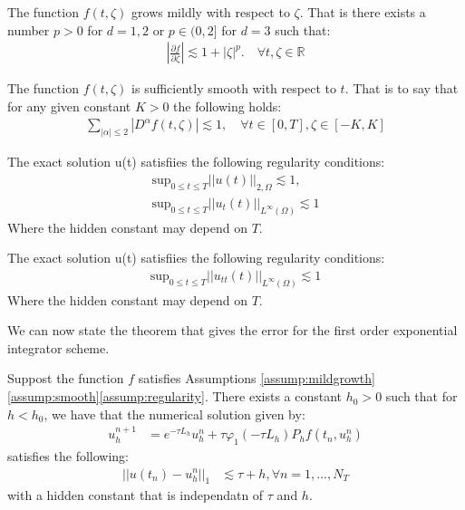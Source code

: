 \begin{assumption}\label{assump:mildgrowth}
    The function $f(t,\zeta)$ grows mildly with respect to $\zeta$.
    That is there exists a number $p>0$ for $d=1,2$ or $p\in(0,2]$ for $d=3$ such that:
    \begin{align*}
        |\frac{\partial f}{\partial \zeta}| \lesssim 1 + |\zeta|^p. \quad \forall t,\zeta \in \mathbb{R}
    \end{align*}
\end{assumption}
\begin{assumption}\label{assump:smooth}
    The function $f(t, \zeta)$ is sufficiently smooth with respect to $t$.
    That is to say that for any given constant $K>0$ the following holds:
    \begin{align*}
        \sum_{|\alpha|\leq2}|D^{\alpha}f(t,\zeta)|\lesssim 1, \quad \forall t\in [0,T], \zeta \in[-K,K]
    \end{align*}
\end{assumption}
\begin{assumption}\label{assump:regularity}
    The exact solution u(t) satisfiies the following regularity conditions:
    \begin{align*}
        \text{sup}_{0\leq t \leq T}||u(t)||_{2,\Omega} \lesssim 1,\\
        \text{sup}_{0\leq t \leq T}||u_t(t)||_{L^\infty(\Omega)} \lesssim 1
    \end{align*}
    Where the hidden constant may depend on $T$.
\end{assumption}
\begin{assumption}\label{assump:regularity2}
    The exact solution u(t) satisfiies the following regularity conditions:
    \begin{align*}
        \text{sup}_{0\leq t \leq T}||u_{tt}(t)||_{L^\infty(\Omega)} \lesssim 1
    \end{align*}
    Where the hidden constant may depend on $T$.
\end{assumption}

We can now state the theorem that gives the error for the first order exponential integrator scheme.
\begin{theorem}\label{theorem:standard1}
    Suppost the function $f$ satisfies Assumptions \ref{assump:mildgrowth}\ref{assump:smooth}\ref{assump:regularity}.
    There exists a constant $h_0 > 0$ such that for $h<h_0$, we have that the numerical solution given by:
    \begin{align*}
        u_h^{n+1} &= e^{-\tau L_h}u_h^n + \tau \varphi_1(-\tau L_h)P_hf(t_n,u_h^n)
    \end{align*}
    satisfies the following:
    \begin{align*}
        ||u(t_n) - u_h^n||_1 &\lesssim \tau + h, \forall n =1,...,N_T
    \end{align*}
    with a hidden constant that is independatn of $\tau$ and $h$.
\end{theorem}

